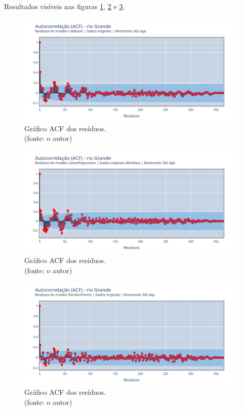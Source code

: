 Resultados visíveis nas figuras \ref{fig:grande_CB_WFV_ORIG_RESID_ACF}, \ref{fig:grande_LR_WFV_ORIG_RESID_ACF} e \ref{fig:grande_RF_WFV_ORIG_RESID_ACF}.

\begin{figure}[!h]
	\centering
	\includegraphics[scale=0.33]{Figuras/rio_grande/wfv/CB/CB_WFV_ORIG_RESID_ACF.png}
	\caption{Gráfico ACF dos resíduos.\\(fonte: o autor)}
	\label{fig:grande_CB_WFV_ORIG_RESID_ACF}
\end{figure}

\begin{figure}[!h]
	\centering
	\includegraphics[scale=0.33]{Figuras/rio_grande/wfv/LR/LR_WFV_ORIG_RESID_ACF.png}
	\caption{Gráfico ACF dos resíduos.\\(fonte: o autor)}
	\label{fig:grande_LR_WFV_ORIG_RESID_ACF}
\end{figure}

\begin{figure}[!h]
	\centering
	\includegraphics[scale=0.33]{Figuras/rio_grande/wfv/RF/RF_WFV_ORIG_RESID_ACF.png}
	\caption{Gráfico ACF dos resíduos.\\(fonte: o autor)}
	\label{fig:grande_RF_WFV_ORIG_RESID_ACF}
\end{figure}
\clearpage

